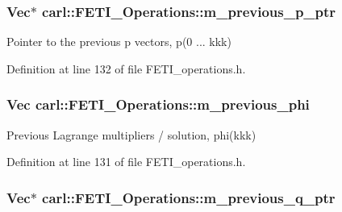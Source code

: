 \subsubsection[{m\+\_\+previous\+\_\+p\+\_\+ptr}]{\setlength{\rightskip}{0pt plus 5cm}Vec$\ast$ carl\+::\+F\+E\+T\+I\+\_\+\+Operations\+::m\+\_\+previous\+\_\+p\+\_\+ptr\hspace{0.3cm}{\ttfamily [protected]}}\label{classcarl_1_1_f_e_t_i___operations_acc8155a94e5289396768f891b9c29627}


Pointer to the previous {\ttfamily p} vectors, {\ttfamily p(0 ... kkk)} 



Definition at line 132 of file F\+E\+T\+I\+\_\+operations.\+h.

\hypertarget{classcarl_1_1_f_e_t_i___operations_a55eed597eea536ba6d7956267b178a89}{}
\subsubsection[{m\+\_\+previous\+\_\+phi}]{\setlength{\rightskip}{0pt plus 5cm}Vec carl\+::\+F\+E\+T\+I\+\_\+\+Operations\+::m\+\_\+previous\+\_\+phi\hspace{0.3cm}{\ttfamily [protected]}}\label{classcarl_1_1_f_e_t_i___operations_a55eed597eea536ba6d7956267b178a89}


Previous Lagrange multipliers / solution, {\ttfamily phi(kkk)} 



Definition at line 131 of file F\+E\+T\+I\+\_\+operations.\+h.

\hypertarget{classcarl_1_1_f_e_t_i___operations_a7ff19f8422276b403c971d31611945c5}{}
\subsubsection[{m\+\_\+previous\+\_\+q\+\_\+ptr}]{\setlength{\rightskip}{0pt plus 5cm}Vec$\ast$ carl\+::\+F\+E\+T\+I\+\_\+\+Operations\+::m\+\_\+previous\+\_\+q\+\_\+ptr\hspace{0.3cm}{\ttfamily [protected]}}\label{classcarl_1_1_f_e_t_i___operations_a7ff19f8422276b403c971d31611945c5}


